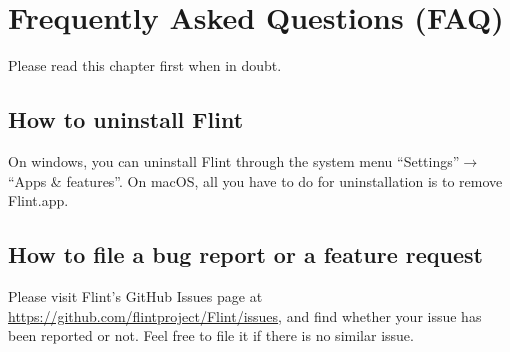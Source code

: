 \documentclass[a4paper,10pt]{report}
\begin{document}

\chapter{Frequently Asked Questions (FAQ)}
Please read this chapter first when in doubt.

\section{How to uninstall Flint}
On windows, you can uninstall Flint through the system menu ``Settings''$\rightarrow$``Apps \& features''.
On macOS, all you have to do for uninstallation is to remove Flint.app.

\section{How to file a bug report or a feature request}
Please visit Flint's GitHub Issues page at
\url{https://github.com/flintproject/Flint/issues},
and find whether your issue has been reported or not.
Feel free to file it if there is no similar issue.




\end{document}
